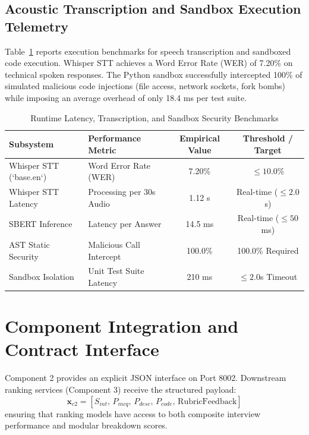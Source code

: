 \documentclass[conference]{IEEEtran}
\begin{document}
\subsection{Acoustic Transcription and Sandbox Execution Telemetry}
Table~\ref{tab:c2_telemetry} reports execution benchmarks for speech transcription and sandboxed code execution. Whisper STT achieves a Word Error Rate (WER) of 7.20\% on technical spoken responses. The Python sandbox successfully intercepted 100\% of simulated malicious code injections (file access, network sockets, fork bombs) while imposing an average overhead of only 18.4 ms per test suite.

\begin{table}[h]
\centering
\caption{Runtime Latency, Transcription, and Sandbox Security Benchmarks}
\label{tab:c2_telemetry}
\begin{tabular}{@{}llcc@{}}
\toprule
\textbf{Subsystem} & \textbf{Performance Metric} & \textbf{Empirical Value} & \textbf{Threshold / Target} \\
\midrule
Whisper STT (`base.en`) & Word Error Rate (WER) & 7.20\% & $\le 10.0\%$ \\
Whisper STT Latency & Processing per 30s Audio & 1.12 s & Real-time ($\le 2.0$s) \\
SBERT Inference & Latency per Answer & 14.5 ms & Real-time ($\le 50$ms) \\
AST Static Security & Malicious Call Intercept & 100.0\% & 100.0\% Required \\
Sandbox Isolation & Unit Test Suite Latency & 210 ms & $\le 2.0$s Timeout \\
\bottomrule
\end{tabular}
\end{table}

\section{Component Integration and Contract Interface}
Component 2 provides an explicit JSON interface on Port 8002. Downstream ranking services (Component 3) receive the structured payload:
\begin{equation}
\mathbf{x}_{c2} = \left[ S_{int}, \, P_{mcq}, \, P_{desc}, \, P_{code}, \, \text{RubricFeedback} \right]
\end{equation}
ensuring that ranking models have access to both composite interview performance and modular breakdown scores.
\end{document}
